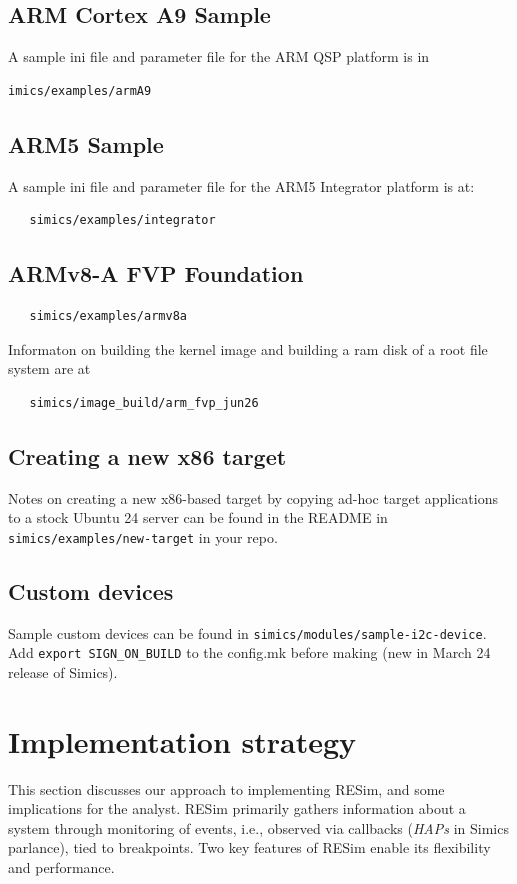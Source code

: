 \documentclass[titlepage]{article}
\begin{document}
\subsection{ARM Cortex A9 Sample}
A sample ini file and parameter file for the ARM QSP platform is in 
\begin{verbatim}
imics/examples/armA9
\end{verbatim}

\subsection{ARM5 Sample}
A sample ini file and parameter file for the ARM5 Integrator platform is at:
\begin{verbatim}
   simics/examples/integrator
\end{verbatim}

\subsection{ARMv8-A FVP Foundation}
\begin{verbatim}
   simics/examples/armv8a
\end{verbatim}
Informaton on building the kernel image and building a ram disk of a root file system are at
\begin{verbatim}
   simics/image_build/arm_fvp_jun26
\end{verbatim}

\subsection{Creating a new x86 target}
Notes on creating a new x86-based target by copying ad-hoc target applications to a stock
Ubuntu 24 server can be found in the
README in {\tt simics/examples/new-target} in your repo.

\subsection{Custom devices}
Sample custom devices can be found in {\tt simics/modules/sample-i2c-device}.
Add {\tt export SIGN\_ON\_BUILD} to the config.mk before making (new in March 24 release of Simics).


\section{Implementation strategy}
\label{implementation}
This section discusses our approach to implementing RESim, and some implications for the analyst.
RESim primarily gathers information about a system through monitoring of events, i.e., observed via callbacks (\textit{HAPs} in Simics parlance), tied to 
breakpoints.  Two key features of RESim enable its flexibility and performance.  
\end{document}
